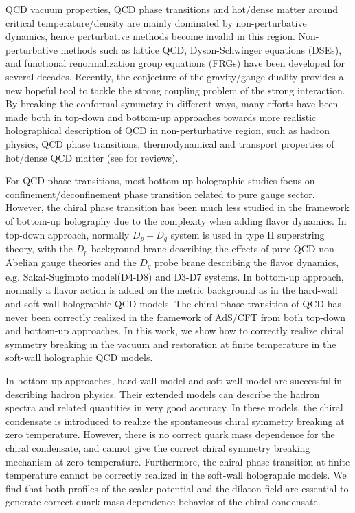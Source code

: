 \documentclass[aps,prd,showpacs,preprintnumbers,twocolumn]{revtex4}
\begin{document}
QCD vacuum properties, QCD phase transitions and hot/dense matter around critical temperature/density are mainly dominated by
non-perturbative dynamics, hence perturbative methods become invalid in this region. Non-perturbative methods such as lattice QCD,
Dyson-Schwinger equations (DSEs), and functional renormalization group equations (FRGs) have been developed for several decades.
Recently, the conjecture of the gravity/gauge duality \cite{Maldacena:1997re,Gubser:1998bc,Witten:1998qj} provides a new hopeful
tool to tackle the strong coupling problem of the strong interaction. By breaking the conformal symmetry in different ways, many efforts
have been made both in top-down and bottom-up approaches towards more realistic holographical description of QCD in non-perturbative
region, such as hadron physics, QCD phase transitions, thermodynamical and transport properties of hot/dense QCD matter  (see \cite{Aharony:1999ti,Erdmenger:2007cm,CasalderreySolana:2011us,deTeramond:2012rt,Adams:2012th}
 for reviews).

For QCD phase transitions, most bottom-up holographic studies focus on confinement/deconfinement phase transition related to pure gauge sector.
However, the chiral phase transition has been much less studied in the framework of bottom-up holography due to the complexity when adding
flavor dynamics. In top-down approach, normally $D_p-D_q$ system is used in type II superstring theory, with the $D_p$ background
brane describing the effects of pure QCD non-Abelian gauge theories and the $D_q$ probe brane describing the flavor dynamics, e.g.
Sakai-Sugimoto model(D4-D8)\cite{SS-1,SS-2} and D3-D7\cite{D3-D7}  systems.
 In bottom-up approach, normally a flavor action is added on the metric background
as in the hard-wall  \cite{Erlich:2005qh} and soft-wall
\cite{Karch:2006pv,TB:05,Colangelo:2011sr,Gherghetta-Kapusta-Kelley,Gherghetta-Kapusta-Kelley-2,YLWu,YLWu-1,Cui:2013xva,Li:2012ay,Li:2013oda}
holographic QCD models. The chiral phase transition of QCD has never been correctly realized in the framework of AdS/CFT from both top-down
and bottom-up approaches. In this work, we show how to correctly realize chiral symmetry breaking in the vacuum and restoration at finite temperature
in the soft-wall holographic QCD models.

In bottom-up approaches, hard-wall model \cite{Erlich:2005qh} and soft-wall model \cite{Karch:2006pv} are successful in describing hadron physics. Their extended models
\cite{Gherghetta-Kapusta-Kelley,Gherghetta-Kapusta-Kelley-2,YLWu,YLWu-1,Cui:2013xva,Li:2012ay,Li:2013oda}
can describe the hadron spectra and related quantities in very good accuracy. In these models, the chiral condensate is introduced to realize the spontaneous chiral symmetry breaking at zero temperature. However, there is no correct quark mass dependence for the chiral condensate, and cannot give the correct chiral symmetry breaking mechanism at zero temperature. Furthermore, the chiral phase transition at finite temperature cannot be correctly realized in the soft-wall holographic models. We find that both profiles of the scalar potential and the dilaton field are essential to generate correct quark mass dependence behavior of the chiral condensate.
\end{document}
